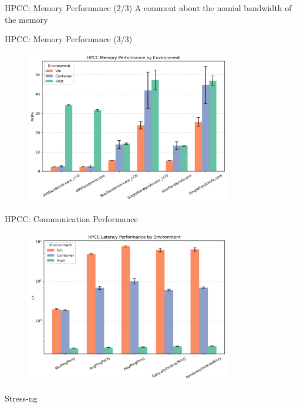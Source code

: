 \documentclass[10pt]{beamer}
\begin{document}
\begin{frame}{HPCC: Memory Performance (2/3)}
  A comment about the nomial bandwidth of the memory
  
\end{frame}

\begin{frame}{HPCC: Memory Performance (3/3)}
  \begin{figure}
    \centering
    \includegraphics[width=0.8\textwidth]{hpcc_memory_performance.png}
  \end{figure}
\end{frame}

\begin{frame}{HPCC: Communication Performance}
  \begin{figure}
    \centering
    \includegraphics[width=0.8\textwidth]{hpcc_latency_performance.png}
  \end{figure}
\end{frame}

\begin{frame}{Stress-ng}
\end{frame}
\end{document}
